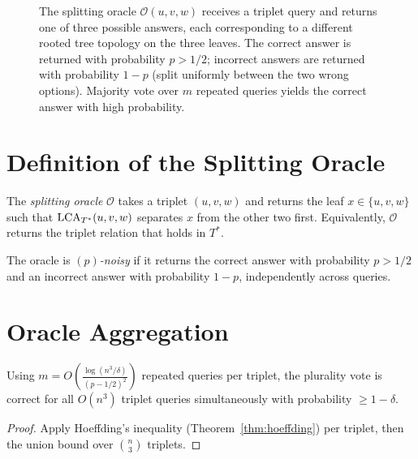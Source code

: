 \begin{figure}[ht]
\caption{The splitting oracle $\mathcal{O}(u,v,w)$ receives a triplet query and returns one of three possible answers, each corresponding to a different rooted tree topology on the three leaves. The correct answer is returned with probability $p > 1/2$; incorrect answers are returned with probability $1-p$ (split uniformly between the two wrong options). Majority vote over $m$ repeated queries yields the correct answer with high probability.}
\label{fig:oracle}
\end{figure}

\section{Definition of the Splitting Oracle}

\begin{definition}
The \emph{splitting oracle} $\mathcal{O}$ takes a triplet $(u,v,w)$ and returns the leaf $x \in \{u,v,w\}$ such that $\operatorname{LCA}_{T^*}(u,v,w)$ separates $x$ from the other two first. Equivalently, $\mathcal{O}$ returns the triplet relation that holds in $T^*$.
\end{definition}

\begin{definition}
The oracle is \emph{$(p)$-noisy} if it returns the correct answer with probability $p > 1/2$ and an incorrect answer with probability $1-p$, independently across queries.
\end{definition}

\section{Oracle Aggregation}

\begin{proposition}
Using $m = O\!\left(\frac{\log(n^3/\delta)}{(p-1/2)^2}\right)$ repeated queries per triplet, the plurality vote is correct for all $O(n^3)$ triplet queries simultaneously with probability $\geq 1-\delta$.
\end{proposition}

\begin{proof}
Apply Hoeffding's inequality (Theorem~\ref{thm:hoeffding}) per triplet, then the union bound over $\binom{n}{3}$ triplets.
\end{proof}


